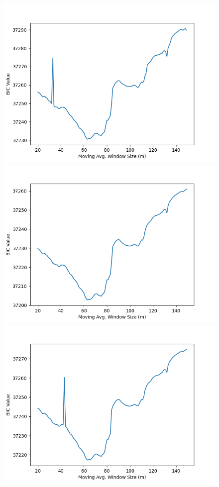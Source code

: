 \documentclass{article}
\begin{document}
\begin{figure}[!ht]
\begin{center}
\begin{spacing}{0.5}
\includegraphics[scale=0.3]{Both_Cr}
\includegraphics[scale=0.3]{Prop_Vol_Cr}
\includegraphics[scale=0.3]{Vol_Cr}
\end{spacing}
\end{center}
\end{figure}
\end{document}
